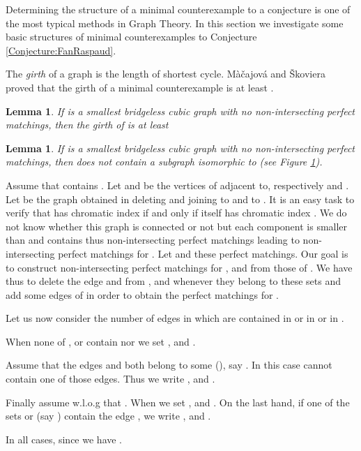 \documentclass{elsart}
\theoremstyle{plain} \theoremheaderfont{\scshape}
\newtheorem{Lem}[Thm]{\bf Lemma}
\newenvironment{Prf}{{\bf \noindent Proof } }{\hfill\\}
\begin{document}
Determining the structure of a minimal counterexample to a
conjecture is one of the most typical methods in Graph Theory. In
this section we investigate some basic structures of minimal
counterexamples to Conjecture \ref{Conjecture:FanRaspaud}.

The {\em girth} of a graph is the length of shortest cycle.
M\`{a}\v{c}ajov\'{a} and  \v{S}koviera \cite{MacSko} proved that the
girth of a minimal counterexample is at least .
\begin{Lem}\cite{MacSko} \label{Lemma:Girth5}  If  is a smallest bridgeless
cubic graph with no  non-intersecting perfect matchings, then the
girth of  is at least 
\end{Lem}


\begin{figure}[t]
\begin{center}
\centering{} \hsize{} \caption{}
 \label{Figure:G8}
\end{center}
\end{figure}




\begin{Lem}\label{Lemma:Graph8}  If  is a smallest bridgeless
cubic graph with no  non-intersecting perfect matchings, then 
does not contain a subgraph isomorphic to   (see Figure
\ref{Figure:G8}).
\end{Lem}
\begin{Prf}
Assume that  contains . Let  and  be the
vertices of  adjacent to, respectively  and . Let
 be the graph obtained in deleting  and joining  to
 and  to . It is an easy task to verify that  has
chromatic index  if and only if  itself has chromatic index
.   We do not know whether this graph is connected or not but
each component is smaller than  and contains thus 
non-intersecting perfect matchings leading to  non-intersecting
perfect matchings for . Let   and  these perfect
matchings. Our goal is to construct  non-intersecting perfect
matchings for  ,  and  from those of . We have
thus to delete the edge  and  from ,  and
 whenever they belong to these sets and add some edges of 
in order to obtain the perfect matchings for .

Let us now consider the number of edges in  which are
contained in  or in  or in .

When none of , or  contain
 nor  we set ,  and .

Assume that the edges  and  both belong to some  (), say . In this case 
cannot contain one of those edges. Thus we write
, and
.

Finally assume w.l.o.g that . When  we set ,  and . On the last hand, if one of
the sets  or  (say ) contain
the edge , we write , and
.

In all cases, since  we have .

\end{Prf}
\end{document}
